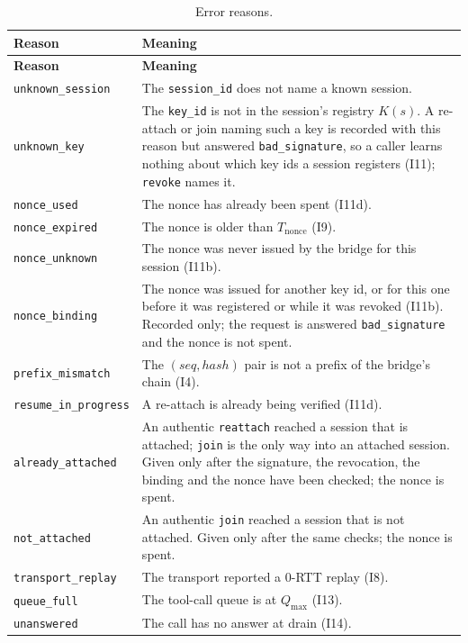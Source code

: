 \footnotesize
\begin{longtable}{p{} p{}}
\caption{Error reasons.}\label{tab:wire-reasons}\\
\toprule
\textbf{Reason} & \textbf{Meaning} \\
\midrule
\endfirsthead
\toprule
\textbf{Reason} & \textbf{Meaning} \\
\midrule
\endhead
\texttt{unknown\_session} & The \texttt{session\_id} does not name a known session. \\
\texttt{unknown\_key} & The \texttt{key\_id} is not in the session's registry $K(s)$. A re-attach or join naming such a key is recorded with this reason but answered \texttt{bad\_signature}, so a caller learns nothing about which key ids a session registers (I11); \texttt{revoke} names it. \\
\texttt{nonce\_used} & The nonce has already been spent (I11d). \\
\texttt{nonce\_expired} & The nonce is older than $T_{\text{nonce}}$ (I9). \\
\texttt{nonce\_unknown} & The nonce was never issued by the bridge for this session (I11b). \\
\texttt{nonce\_binding} & The nonce was issued for another key id, or for this one before it was registered or while it was revoked (I11b). Recorded only; the request is answered \texttt{bad\_signature} and the nonce is not spent. \\
\texttt{prefix\_mismatch} & The $(\mathit{seq}, \mathit{hash})$ pair is not a prefix of the bridge's chain (I4). \\
\texttt{resume\_in\_progress} & A re-attach is already being verified (I11d). \\
\texttt{already\_attached} & An authentic \texttt{reattach} reached a session that is attached; \texttt{join} is the only way into an attached session. Given only after the signature, the revocation, the binding and the nonce have been checked; the nonce is spent. \\
\texttt{not\_attached} & An authentic \texttt{join} reached a session that is not attached. Given only after the same checks; the nonce is spent. \\
\texttt{transport\_replay} & The transport reported a 0-RTT replay (I8). \\
\texttt{queue\_full} & The tool-call queue is at $Q_{\max}$ (I13). \\
\texttt{unanswered} & The call has no answer at drain (I14). \\

\end{longtable}

